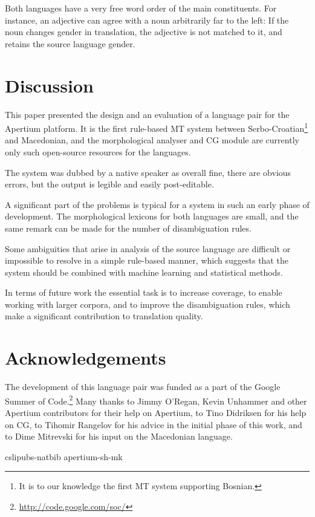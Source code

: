 \documentclass{book}
\begin{document}
Both languages have a very free word order of the main constituents. For instance, an 
adjective can agree with a noun arbitrarily far to the left:
If the noun 
changes gender in translation, the adjective is not matched to it, and retains
the source language gender.

\section{Discussion}
This paper presented the design and an evaluation of a language pair for the Apertium platform.
It is the first rule-based MT system between Serbo-Croatian\footnote{It is to our knowledge the first 
MT system supporting Bosnian.} and Macedonian, and the morphological
analyser and CG module are currently only such open-source resources for the languages.

The system was dubbed by a native speaker as overall fine, there are obvious errors, but the output is legible and easily post-editable. 

A significant part of the problems is typical for a system in such an early phase of 
development. The morphological lexicons for both languages are small, and 
the same remark can be made for the number of disambiguation rules. 

Some ambiguities that arise in analysis of the source language are 
difficult or impossible to resolve in a simple rule-based manner, which suggests that 
the system should be combined with machine learning and statistical methods.

In terms of future work the essential task is to increase coverage, to enable working
with larger corpora, and to improve the disambiguation rules, which make a significant
contribution to translation quality.

\section*{Acknowledgements}
The development of this language pair was funded as a part of the 
Google Summer of Code.\footnote{\url{http://code.google.com/soc/}}
Many thanks to Jimmy O'Regan, Kevin Unhammer and other Apertium contributors for
their help on Apertium, to Tino Didriksen for his help on CG, to Tihomir Rangelov
for his advice in the initial phase of this work, and to Dime Mitrevski
for his input on the Macedonian language.

 {cslipubs-natbib}
 {apertium-sh-mk}

\backmatter
\end{document}
